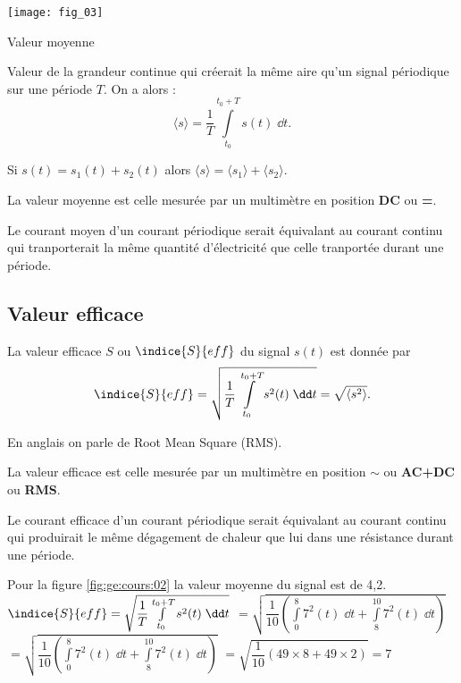 \begin{marginfigure}
\texttt{[image: fig\_03]}
\caption{Valeur moyenne\label{fig:ge:cours:03}}
\end{marginfigure}

\begin{defi}
Valeur de la grandeur continue qui créerait la même aire qu'un signal périodique sur une période $T$.
On a alors : 
$$\langle s \rangle = \dfrac{1}{T} \int\limits_{t_0}^{t_0+T} s(t)\; \dd t.$$
\end{defi}

\begin{prop}
Si $s(t) = s_1(t)+s_2(t)$ alors  $\langle s \rangle = \langle s_1 \rangle+\langle s_2 \rangle$.
\end{prop}

La valeur moyenne est celle mesurée par un multimètre en position \textbf{DC} ou \textbf{=}.

Le courant moyen d'un courant périodique serait équivalant au courant continu qui tranporterait la même quantité d'électricité que celle tranportée durant une période.

\subsection{Valeur efficace}
\begin{defi}
La valeur efficace $S$ ou $\indice{S}{eff}$ du signal $s(t)$ est donnée par  
$$\indice{S}{eff} = \sqrt{\dfrac{1}{T} \int\limits_{t_0}^{t_0+T} s^2(t)\; \dd t} = \sqrt{\langle s^2 \rangle}.$$

En anglais on parle de Root Mean Square (RMS).
\end{defi}


La valeur efficace est celle mesurée par un multimètre en position $\sim$ 
ou \textbf{AC+DC} ou \textbf{RMS}.

Le courant efficace d'un courant périodique serait équivalant au courant continu qui produirait le même dégagement de chaleur que lui dans une résistance durant une période.

Pour la figure \ref{fig:ge:cours:02} la valeur moyenne du signal est de 4,2.
$\indice{S}{eff} = \sqrt{\dfrac{1}{T} \int\limits_{t_0}^{t_0+T} s^2(t)\; \dd t}$
$=\sqrt{\dfrac{1}{10} \left( \int\limits_{0}^{8} 7^2(t)\; \dd t + \int\limits_{8}^{10} 7^2(t)\; \dd t\right)}$
$=\sqrt{\dfrac{1}{10} \left( \int\limits_{0}^{8} 7^2(t)\; \dd t + \int\limits_{8}^{10} 7^2(t)\; \dd t\right)}$
$=\sqrt{\dfrac{1}{10} \left( 49 \times 8 + 49 \times 2\right)}=7$



